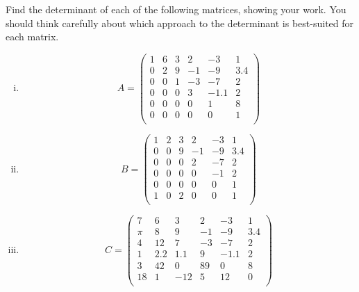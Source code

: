 \begin{question}
\normalfont
\noindent Find the determinant of each of the following matrices, showing your work. You should think carefully about which approach to the determinant is best-suited for each matrix. 

\begin{enumerate}[(i)]

\item \[A= \left( \begin{array}{cccccc}
1 & 6 & 3 & 2  & -3 & 1\\
0 & 2 & 9 & - 1 & - 9 & 3.4\\
0 & 0 & 1 & -3 & -7& 2\\
0 & 0 & 0 & 3 & -1.1 & 2\\
0 & 0 & 0 & 0 & 1& 8\\
0 & 0 & 0 & 0 & 0& 1\\
\end{array} \right)\]



\item \[B= \left( \begin{array}{cccccc}
1 & 2 & 3 & 2  & -3 & 1\\
0 & 0 & 9 & - 1 & - 9 & 3.4\\
0 & 0 & 0 & 2 & -7& 2\\
0 & 0 & 0 & 0 & -1 & 2\\
0 & 0 & 0 & 0 & 0 & 1\\
1 & 0 & 2 & 0 & 0& 1\\
\end{array} \right)\]




\item \[
C= \left( \begin{array}{cccccc}
7 & 6 & 3 & 2  & -3 & 1\\
\pi & 8 & 9 & - 1 & - 9 & 3.4\\
4 & 12 & 7 & -3 & -7& 2\\
1 & 2.2 & 1.1 & 9 & -1.1 & 2\\
3 & 42 & 0 & 89 & 0& 8\\
18 & 1 & -12 & 5 & 12& 0\\
\end{array} \right)\]
\end{enumerate}

\end{question}